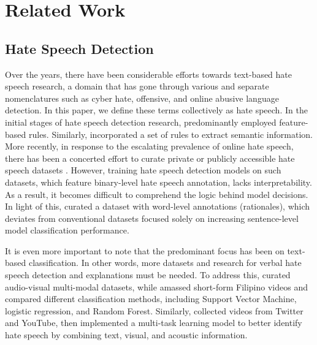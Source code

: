 \documentclass[11pt]{article}
\begin{document}
\section{Related Work}


\subsection{Hate Speech Detection}
Over the years, there have been considerable efforts towards text-based hate speech research, a domain that has gone through various and separate nomenclatures such as cyber hate, offensive, and online abusive \citet{abusive,abusivehatespeech} language detection. In this paper, we define these terms collectively as hate speech. In the initial stages of hate speech detection research, \citet{Smokey-1997} predominantly employed feature-based rules. Similarly, \citet{FlameDetection2} incorporated a set of rules to extract semantic information. More recently, in response to the escalating prevalence of online hate speech, there has been a concerted effort to curate private or publicly accessible hate speech datasets \citet{dataset1, dataset2}. However, training hate speech detection models on such datasets, which feature binary-level hate speech annotation, lacks interpretability. As a result, it becomes difficult to comprehend the logic behind model decisions. In light of this, \citet{HateXplain} curated a dataset with word-level annotations (rationales), which deviates from conventional datasets focused solely on increasing sentence-level model classification performance.

It is even more important to note that the predominant focus has been on text-based classification. In other words, more datasets and research for verbal hate speech detection and explanations must be needed. To address this, \citet{Audio1, Audio2-emotion} curated audio-visual multi-modal datasets, while \citet{Audio1} amassed short-form Filipino videos and compared different classification methods, including Support Vector Machine, logistic regression, and Random Forest. Similarly, \citet{Audio2-emotion} collected videos from Twitter and YouTube, then implemented a multi-task learning model to better identify hate speech by combining text, visual, and acoustic information.
\end{document}
